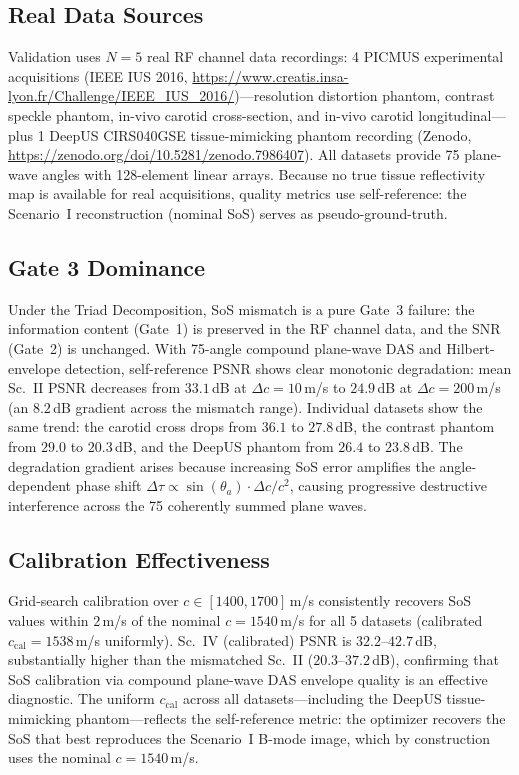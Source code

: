 \documentclass[11pt]{article}
\begin{document}
\subsection{Real Data Sources}
Validation uses $N{=}5$ real RF channel data recordings: 4 PICMUS experimental acquisitions (IEEE IUS 2016, \url{https://www.creatis.insa-lyon.fr/Challenge/IEEE_IUS_2016/})---resolution distortion phantom, contrast speckle phantom, in-vivo carotid cross-section, and in-vivo carotid longitudinal---plus 1 DeepUS CIRS040GSE tissue-mimicking phantom recording (Zenodo, \url{https://zenodo.org/doi/10.5281/zenodo.7986407}). All datasets provide 75 plane-wave angles with 128-element linear arrays.
Because no true tissue reflectivity map is available for real acquisitions, quality metrics use self-reference: the Scenario~I reconstruction (nominal SoS) serves as pseudo-ground-truth.

\subsection{Gate 3 Dominance}
Under the Triad Decomposition, SoS mismatch is a pure Gate~3 failure: the information content (Gate~1) is preserved in the RF channel data, and the SNR (Gate~2) is unchanged. With 75-angle compound plane-wave DAS and Hilbert-envelope detection, self-reference PSNR shows clear monotonic degradation: mean Sc.~II PSNR decreases from $33.1$\,dB at $\Delta c{=}10$\,m/s to $24.9$\,dB at $\Delta c{=}200$\,m/s (an $8.2$\,dB gradient across the mismatch range). Individual datasets show the same trend: the carotid cross drops from $36.1$ to $27.8$\,dB, the contrast phantom from $29.0$ to $20.3$\,dB, and the DeepUS phantom from $26.4$ to $23.8$\,dB. The degradation gradient arises because increasing SoS error amplifies the angle-dependent phase shift $\Delta\tau \propto \sin(\theta_a)\cdot\Delta c / c^2$, causing progressive destructive interference across the 75 coherently summed plane waves.

\subsection{Calibration Effectiveness}
Grid-search calibration over $c \in [1400, 1700]$\,m/s consistently recovers SoS values within $2$\,m/s of the nominal $c{=}1540$\,m/s for all 5 datasets (calibrated $c_{\mathrm{cal}} = 1538$\,m/s uniformly). Sc.~IV (calibrated) PSNR is $32.2$--$42.7$\,dB, substantially higher than the mismatched Sc.~II ($20.3$--$37.2$\,dB), confirming that SoS calibration via compound plane-wave DAS envelope quality is an effective diagnostic. The uniform $c_{\mathrm{cal}}$ across all datasets---including the DeepUS tissue-mimicking phantom---reflects the self-reference metric: the optimizer recovers the SoS that best reproduces the Scenario~I B-mode image, which by construction uses the nominal $c{=}1540$\,m/s.
\end{document}
